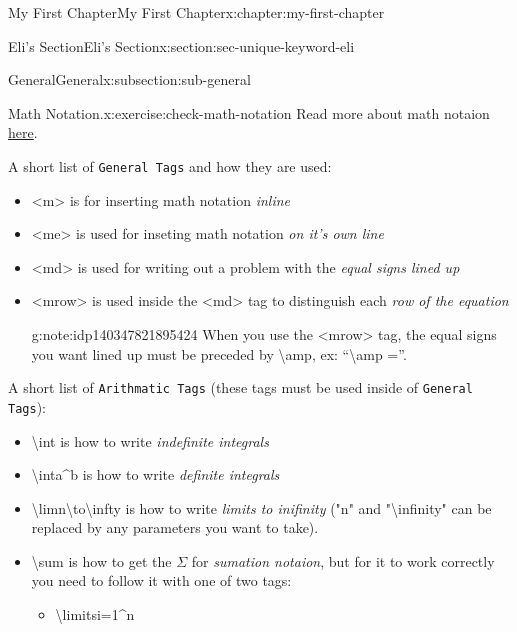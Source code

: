 \documentclass[oneside,10pt,]{book}
\newcommand{\mono}[1]{\texttt{#1}}
\numberwithin{equation}{section}
\begin{document}
\begin{chapterptx}{My First Chapter}{}{My First Chapter}{}{}{x:chapter:my-first-chapter}
\begin{sectionptx}{Eli's Section}{}{Eli's Section}{}{}{x:section:sec-unique-keyword-eli}
%
\begin{subsectionptx}{General}{}{General}{}{}{x:subsection:sub-general}
\begin{inlineexercise}{Math Notation.}{x:exercise:check-math-notation}%
Read more about math notaion \href{https://pretextbook.org/doc/guide/html/topic-mathematics.html}{here}.%
\par
A short list of \mono{General Tags} and how they are used:%
\begin{itemize}[label=\textbullet]
\item{}\textless{}m\textgreater{} is for inserting math notation \emph{inline}%
\item{}\textless{}me\textgreater{} is used for inseting math notation \emph{on it's own line}%
\item{}\textless{}md\textgreater{} is used for writing out a problem with the \emph{equal signs lined up}%
\item{}\textless{}mrow\textgreater{} is used inside the \textless{}md\textgreater{} tag to distinguish each \emph{row of the equation} \begin{note}{}{g:note:idp140347821895424}%
When you use the \textless{}mrow\textgreater{} tag, the equal signs you want lined up must be preceded by \textbackslash{}amp, ex: ``\textbackslash{}amp =''.\end{note}
%
\end{itemize}
%
\par
A short list of \mono{Arithmatic Tags} (these tags must be used inside of \mono{General Tags}):%
\begin{itemize}[label=\textbullet]
\item{}\textbackslash{}int is how to write \emph{indefinite integrals}%
\item{}\textbackslash{}int\textunderscore{}a\textasciicircum{}b is how to write \emph{definite integrals}%
\item{}\textbackslash{}lim\textunderscore{}\textbraceleft{}n\textbackslash{}to\textbackslash{}infty\textbraceright{} is how to write \emph{limits to inifinity} ("n" and "\textbackslash{}infinity" can be replaced by any parameters you want to take).%
\item{}\textbackslash{}sum is how to get the \(\Sigma\) for \emph{sumation notaion}, but for it to work correctly you need to follow it with one of two tags:%
\begin{itemize}[label=$\circ$]
\item{}\textbackslash{}limits\textunderscore{}\textbraceleft{}i=1\textbraceright{}\textasciicircum{}n%

\end{itemize}
\end{itemize}
\end{inlineexercise}
\end{subsectionptx}
\end{sectionptx}
\end{chapterptx}
\end{document}
